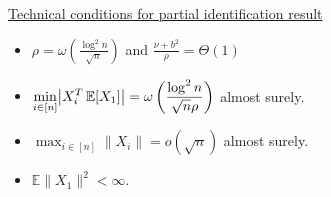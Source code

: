 \documentclass[aspectratio=169]{beamer}
\newcommand{\bbE}{\mathbb{E}}
\newcommand{\E}[2][]{%
	\ifthenelse{ \equal{#1}{} }
	{\ensuremath{\mathbb{E} \brac*{#2}}}
	{\ensuremath{\mathbb{E} \brac*{#2 \, \middle \vert \, #1}}}
}
\DeclarePairedDelimiter{\brac}{[}{]}
\DeclarePairedDelimiter{\abs}{\lvert}{\rvert}
\theoremstyle{remark}
\begin{document}
\begin{frame}
    \underline{Technical conditions for partial identification result} \\
    \vspace{6mm}
    \begin{itemize}
        \setlength{\itemsep}{1.75em}
        \item $\rho = \omega \left( \displaystyle \frac{ \log^2 n }{ \sqrt{n} } \right)$ and $\displaystyle \frac{ \nu + b^2 }{ \rho } = \Theta( 1 )$
        \item $\displaystyle \min_{i \in [n]} \abs*{X_i^T \, \E{X_1}} = \omega\left( \frac{ \log^2 n }{ \sqrt{ n } \rho } \right)$ almost surely.
        \item $\displaystyle \max_{i \in [n]} \| X_i \| = o(\sqrt{n})$ almost surely.
        \item $\displaystyle \bbE \| X_1 \|^2 < \infty$.
    \end{itemize}
\end{frame}



\end{document}
